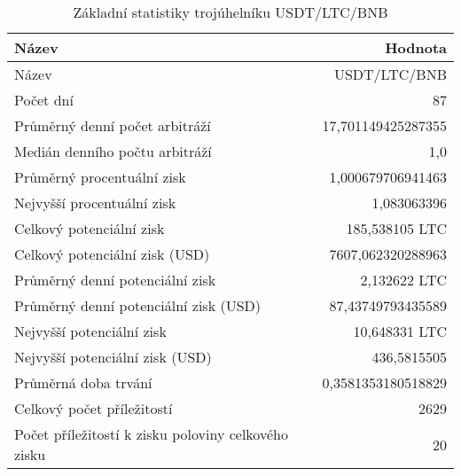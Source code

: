 \begin{table}\centering
\caption{Základní statistiky trojúhelníku USDT/LTC/BNB}
\label{USDTLTCBNB_stats}
\begin{tabular}{|| l | r ||}
\hline Název & Hodnota \\ 
\hline\hline Název & USDT/LTC/BNB \\ 
\hline Počet dní & 87 \\ 
\hline Průměrný denní počet arbitráží & 17,701149425287355 \\ 
\hline Medián denního počtu arbitráží & 1,0 \\ 
\hline Průměrný procentuální zisk & 1,000679706941463 \\ 
\hline Nejvyšší procentuální zisk & 1,083063396 \\ 
\hline Celkový potenciální zisk & 185,538105 LTC \\ 
\hline Celkový potenciální zisk (USD) & 7607,062320288963 \\ 
\hline Průměrný denní potenciální zisk & 2,132622 LTC \\ 
\hline Průměrný denní potenciální zisk (USD) & 87,43749793435589 \\ 
\hline Nejvyšší potenciální zisk & 10,648331 LTC \\ 
\hline Nejvyšší potenciální zisk (USD) & 436,5815505 \\ 
\hline Průměrná doba trvání & 0,3581353180518829 \\ 
\hline Celkový počet příležitostí & 2629 \\ 
\hline Počet příležitostí k zisku poloviny celkového zisku & 20 \\ 
\hline
\end{tabular}
\end{table}